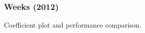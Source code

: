 \clearpage
\subsubsection*{Weeks (2012)}

Coefficient plot and performance comparison.


\FloatBarrier

